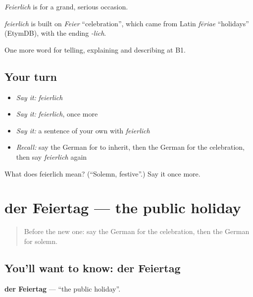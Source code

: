\emph{Feierlich} is for a grand, serious occasion.

\begin{cousinweb}
\emph{feierlich} is built on \emph{Feier} \textquotedblleft{}celebration\textquotedblright{}, which came from Latin \emph{fēriae} \textquotedblleft{}holidays\textquotedblright{} (EtymDB), with the ending \emph{-lich}.
\end{cousinweb}

\begin{grammarlens}[title={What you've built}]
One more word for telling, explaining and describing at B1.
\end{grammarlens}

\subsection*{Your turn}
\begin{itemize}
\raggedright
  \item \emph{Say it:} \emph{feierlich}
  \item \emph{Say it:} \emph{feierlich}, once more
  \item \emph{Say it:} a sentence of your own with \emph{feierlich}
  \item \emph{Recall:} say the German for to inherit, then the German for the celebration, then say \emph{feierlich} again
\end{itemize}

\begin{tcolorbox}[breakable,colback=teal!4,colframe=teal!35!black,title={Before you move on}]
What does feierlich mean? (\textquotedblleft{}Solemn, festive\textquotedblright{}.) Say it once more.
\end{tcolorbox}
\section[der Feiertag]{der Feiertag — the public holiday}

\label{lesson:GE-C305-feiertag}



\begin{quote}
Before the new one: say the German for the celebration, then the German for solemn.
\end{quote}

\subsection*{You'll want to know: der Feiertag}
\textbf{der Feiertag} — \textquotedblleft{}the public holiday\textquotedblright{}.

